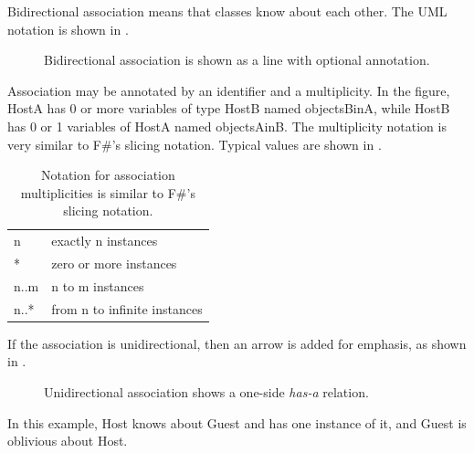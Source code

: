 \documentclass[fsharpNotes.tex]{subfiles}
\begin{document}
Bidirectional association means that classes know about each other. The UML notation is shown in .
\begin{figure}
  \centering
  \caption{Bidirectional association is shown as a line with optional annotation.}
  \label{fig:association}
\end{figure}
Association may be annotated by an identifier and a multiplicity. In the figure, HostA has 0 or more variables of type HostB named objectsBinA, while HostB has 0 or 1 variables of HostA named objectsAinB. The multiplicity notation is very similar to F\#'s slicing notation. Typical values are shown in .
\begin{table}
  \centering
  \begin{tabular}{|l|l|}
    \hline
    n & exactly n instances\\
    * & zero or more instances \\
    n..m & n to m instances\\
    n..* & from n to infinite instances\\
    \hline
  \end{tabular}
  \caption{Notation for association multiplicities is similar to F\#'s slicing notation.}
  \label{tab:multiplicity}
\end{table}
If the association is unidirectional, then an arrow is added for emphasis, as shown in .
\begin{figure}
  \centering
  \caption{Unidirectional association shows a one-side \emph{has-a} relation.}
  \label{fig:unidirectionalAssociation}
\end{figure}
In this example, Host knows about Guest and has one instance of it, and Guest is oblivious about Host.
\end{document}
